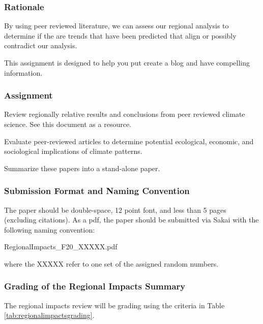 
\subsubsection{Rationale}

By using peer reviewed literature, we can assess our regional analysis to determine if the are trends that have been predicted that align or possibly contradict our analysis. 

This assignment is designed to help you put create a blog and have compelling information. 

\subsubsection{Assignment}

Review regionally relative results and conclusions from peer reviewed climate science. See this document as a resource.

Evaluate peer-reviewed articles to determine potential ecological, economic, and sociological implications of climate patterns.

Summarize these papers into a stand-alone paper. 

\subsubsection{Submission Format and Naming Convention}

The paper should be double-space, 12 point font, and less than 5 pages (excluding citations). As a pdf, the paper should be submitted via Sakai with the following naming convention:

\begin{center}
RegionalImpacts\_F20\_XXXXX.pdf
\end{center}

\medskip \noindent where the XXXXX refer to one set of the assigned random numbers. 

\subsubsection{Grading of the Regional Impacts Summary}

The regional impacts review will be grading using the criteria in Table \ref{tab:regionalimpactsgrading}.

